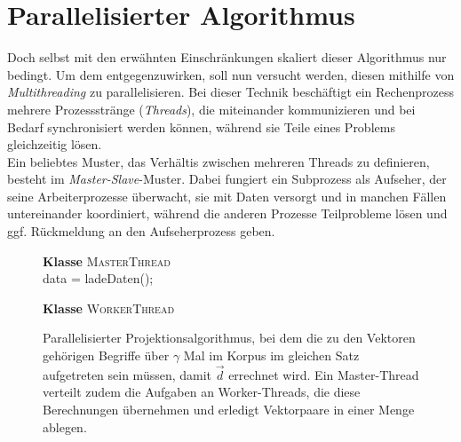 \section{Parallelisierter Algorithmus}\label{sec:para-algo}

Doch selbst mit den erwähnten Einschränkungen skaliert dieser Algorithmus nur bedingt. Um dem entgegenzuwirken, soll nun
versucht werden, diesen mithilfe von \emph{Multithreading} zu parallelisieren. Bei dieser Technik beschäftigt ein Rechenprozess
mehrere Prozessstränge (\emph{Threads}), die miteinander kommunizieren und bei Bedarf synchronisiert werden können,
während sie Teile eines Problems gleichzeitig lösen.\\
Ein beliebtes Muster, das Verhältis zwischen mehreren Threads zu definieren, besteht im \emph{Master-Slave}-Muster.
Dabei fungiert ein Subprozess als Aufseher, der seine Arbeiterprozesse überwacht, sie mit Daten versorgt und in manchen
Fällen untereinander koordiniert, während die anderen Prozesse Teilprobleme lösen und ggf. Rückmeldung an den Aufseherprozess
geben.\\

\begin{figure}[h]
  \centering
  \begin{algorithm}[H]
    \BlankLine
    \textbf{Klasse} \textsc{MasterThread} \\
      data = ladeDaten();\\

    \BlankLine
    \textbf{Klasse} \textsc{WorkerThread} \\
  \end{algorithm}
  \caption[Parallelisierter Projektionsalgorithmus]{Parallelisierter Projektionsalgorithmus, bei dem die zu den Vektoren gehörigen
  Begriffe über $\gamma$ Mal im Korpus im gleichen Satz aufgetreten sein müssen, damit $\vec{d}$ errechnet wird. Ein Master-Thread
  verteilt zudem die Aufgaben an Worker-Threads, die diese Berechnungen übernehmen und erledigt Vektorpaare in einer Menge ablegen.
  \label{fig:algo3}}
\end{figure}

